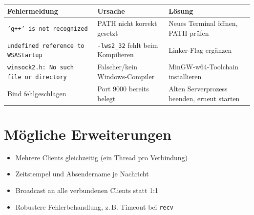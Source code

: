 \documentclass[a4paper,11pt]{article}
\begin{document}
\begin{center}
\begin{tabular}{|p{4.5cm}|p{4.5cm}|p{4.5cm}|}
\hline
\textbf{Fehlermeldung} & \textbf{Ursache} & \textbf{Lösung} \\
\hline
\texttt{'g++' is not recognized} & PATH nicht korrekt gesetzt & Neues
Terminal öffnen, PATH prüfen \\
\hline
\texttt{undefined reference to WSAStartup} & \texttt{-lws2\_32} fehlt beim
Kompilieren & Linker-Flag ergänzen \\
\hline
\texttt{winsock2.h: No such file or directory} & Falscher/kein
Windows-Compiler & MinGW-w64-Toolchain installieren \\
\hline
Bind fehlgeschlagen & Port 9000 bereits belegt & Alten Serverprozess
beenden, erneut starten \\
\hline
\end{tabular}
\end{center}

\section{Mögliche Erweiterungen}

\begin{itemize}
    \item Mehrere Clients gleichzeitig (ein Thread pro Verbindung)
    \item Zeitstempel und Absendername je Nachricht
    \item Broadcast an alle verbundenen Clients statt 1:1
    \item Robustere Fehlerbehandlung, z.\,B. Timeout bei \texttt{recv}
\end{itemize}
\end{document}
